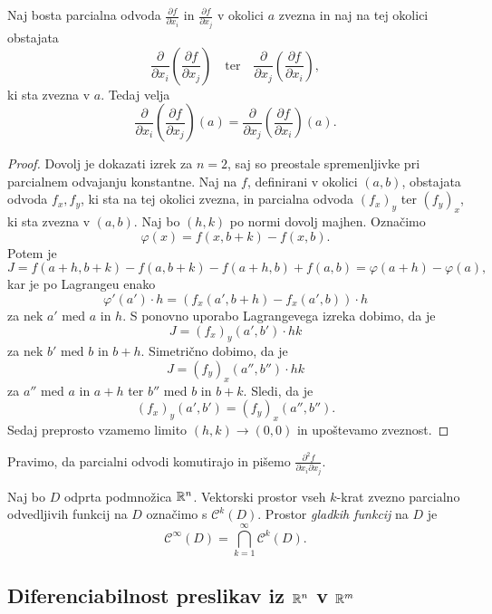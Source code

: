 \begin{izrek}
Naj bosta parcialna odvoda $\frac{\partial f}{\partial x_i}$ in
$\frac{\partial f}{\partial x_j}$ v okolici $a$ zvezna in naj na
tej okolici obstajata
\[
\frac{\partial}{\partial x_i}\left(
	\frac{\partial f}{\partial x_j}
\right)
\quad \text{ter} \quad
\frac{\partial}{\partial x_j}\left(
	\frac{\partial f}{\partial x_i}
\right),
\]
ki sta zvezna v $a$. Tedaj velja
\[
\frac{\partial}{\partial x_i}\left(
	\frac{\partial f}{\partial x_j}
\right)(a) =
\frac{\partial}{\partial x_j}\left(
	\frac{\partial f}{\partial x_i}
\right)(a).
\]
\end{izrek}


\begin{proof}
Dovolj je dokazati izrek za $n=2$, saj so preostale spremenljivke
pri parcialnem odvajanju konstantne. Naj na $f$, definirani v
okolici $(a,b)$, obstajata odvoda $f_x,f_y$, ki sta na tej okolici
zvezna, in parcialna odvoda $(f_x)_y$ ter $(f_y)_x$, ki sta zvezna
v $(a,b)$. Naj bo $(h,k)$ po normi dovolj majhen. Označimo
\[
\varphi(x) = f(x, b+k) - f(x, b).
\]
Potem je
\[
J =
f(a+h, b+k) - f(a, b+k) - f(a+h, b) + f(a, b) =
\varphi(a+h) - \varphi(a),
\]
kar je po Lagrangeu enako
\[
\varphi'(a') \cdot h = \left(
	f_x(a', b+h) - f_x(a', b)
\right) \cdot h
\]
za nek $a'$ med $a$ in $h$. S ponovno uporabo Lagrangevega izreka
dobimo, da je
\[
J = (f_x)_y(a', b')\cdot hk
\]
za nek $b'$ med $b$ in $b+h$. Simetrično dobimo, da je
\[
J = (f_y)_x(a'', b'')\cdot hk
\]
za $a''$ med $a$ in $a+h$ ter $b''$ med $b$ in $b+k$. Sledi, da je
\[
(f_x)_y(a', b') = (f_y)_x(a'', b'').
\]
Sedaj preprosto vzamemo limito $(h, k) \to (0, 0)$ in upoštevamo
zveznost.
\end{proof}

\begin{opomba}
Pravimo, da parcialni odvodi komutirajo in pišemo
$\frac{\partial^2 f}{\partial x_i\partial x_j}$.
\end{opomba}

\begin{definicija}
Naj bo $D$ odprta podmnožica $\mathbb{R}^n$. Vektorski prostor vseh
$k$-krat zvezno parcialno odvedljivih funkcij na $D$ označimo s
$\mathcal{C}^k(D)$. Prostor
\emph{gladkih funkcij} na $D$ je
\[
\mathcal{C}^\infty(D) = \bigcap_{k=1}^\infty \mathcal{C}^k(D).
\]
\end{definicija}

\newpage

\subsection{Diferenciabilnost preslikav iz $\mathbb{R}^n$ v $\mathbb{R}^m$}

